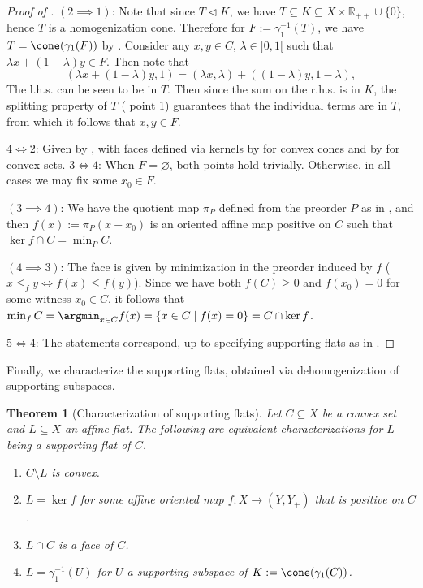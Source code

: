 \documentclass{article}
\theoremstyle{plain}
\newtheorem{theorem}{Theorem}[section]
\theoremstyle{definition}
\theoremstyle{remark}
\begin{document}
\begin{proof}[\hypertarget{loc:characterization_of_the_faces_of_convex_sets.proof}{}Proof of ]
$(2 \implies 1)$:
Note that since $T \triangleleft K$, we have $T \subseteq K \subseteq X  \times \mathbb{R}_{++} \cup \{ 0 \}$, hence $T$ is a homogenization cone. Therefore for $F := \gamma_1^{-1}(T)$, we have $T = \cone(\gamma_1(F))$ by . 
Consider any $x,y \in C$, $\lambda \in ]0,1[$ such that $\lambda x + (1-\lambda) y \in F$. Then note that
\begin{equation*}
(\lambda x + (1-\lambda) y, 1) = (\lambda x, \lambda) + ((1-\lambda) y, 1-\lambda),
\end{equation*}
The l.h.s. can be seen to be in $T$. Then since the sum on the r.h.s. is in $K$, the splitting property of $T$ ( point 1) guarantees that
the individual terms are in $T$, from which it follows that $x, y \in F$.

$4 \iff 2$: Given by ,
with faces defined via kernels by  for convex cones and by  for convex sets.
$3 \iff 4$: When $F = \varnothing$, both points hold trivially.
Otherwise, in all cases we may fix some $x_0 \in F$.

$(3 \implies 4)$: We have the quotient map $\pi_P$ defined from the preorder $P$
as in ,
and then $f(x) := \pi_P(x-x_0)$ is an oriented affine map positive on $C$ such that $\ker f \cap C = \min_P C$.

$(4 \implies 3)$: The face is given by minimization in the preorder induced by $f$
($x \le_{f} y \iff f(x) \le f(y)$).
Since we have both $f(C) \ge 0$ and $f(x_0) = 0$ for some witness $x_0 \in C$, it follows that
$\min_f C = \argmin_{x \in C} f(x) = \{x \in C \mid f(x) = 0\} = C \cap  \ker f$.

$5 \iff 4$: The statements correspond, up to specifying supporting flats as in .
\end{proof}
Finally, we characterize the supporting flats, obtained via
dehomogenization of supporting subspaces.
\begin{theorem}[Characterization of supporting flats]
\label{loc:characterization_of_supporting_flats.statement}
Let $C \subseteq X$ be a convex set and $L \subseteq X$ an affine flat. The following are equivalent characterizations for $L$ being a supporting flat of $C$.
\begin{enumerate}
\item $C \setminus L$ is convex.
\item $L = \ker f$ for some affine oriented map $f:X \to (Y, Y_+)$ that is positive on $C$.
\item $L \cap C$ is a face of $C$.
\item $L = \gamma_1^{-1}(U)$ for $U$ a supporting subspace of $K := \cone(\gamma_1(C))$.
\end{enumerate}
\end{theorem}
\end{document}
